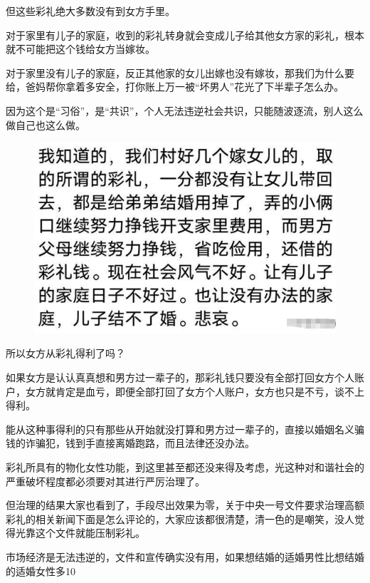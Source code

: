 \documentclass[UTF8,11pt,oneside]{ctexart}
\begin{document}
但这些彩礼绝大多数没有到女方手里。

对于家里有儿子的家庭，收到的彩礼转身就会变成儿子给其他女方家的彩礼，根本就不可能把这个钱给女方当嫁妆。

对于家里没有儿子的家庭，反正其他家的女儿出嫁也没有嫁妆，那我们为什么要给，爸妈帮你拿着多安全，打你账上万一被“坏男人”花光了下半辈子怎么办。


因为这个是“习俗”，是“共识”，个人无法违逆社会共识，只能随波逐流，别人这么做自己也这么做。

\begin{figure}[H]
    \centering
    \includegraphics[width=13cm]{2025-04-17-009.png}
\end{figure}

所以女方从彩礼得利了吗？

如果女方是认认真真想和男方过一辈子的，那彩礼钱只要没有全部打回女方个人账户，女方就肯定是血亏，即便全部打回了女方个人账户，女方也只是不亏，谈不上得利。

能从这种事得利的只有那些从开始就没打算和男方过一辈子的，直接以婚姻名义骗钱的诈骗犯，钱到手直接离婚跑路，而且法律还没办法。

彩礼所具有的物化女性功能，到这里甚至都还没来得及考虑，光这种对和谐社会的严重破坏程度都必须要对其进行严厉治理了。

但治理的结果大家也看到了，手段尽出效果为零，关于中央一号文件要求治理高额彩礼的相关新闻下面是怎么评论的，大家应该都很清楚，清一色的是嘲笑，没人觉得光靠这个文件就能压制彩礼。

市场经济是无法违逆的，文件和宣传确实没有用，如果想结婚的适婚男性比想结婚的适婚女性多10%
\end{document}
